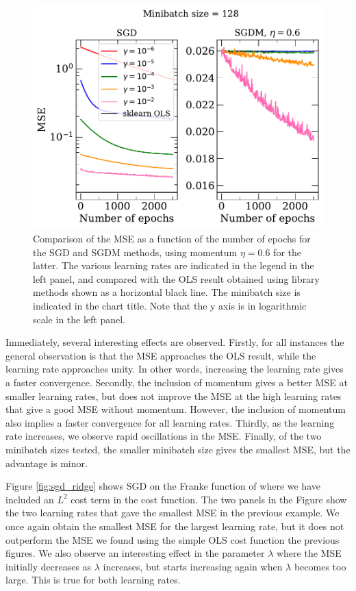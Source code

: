 \documentclass[a4paper, 
amsfonts, 
amssymb, 
amsmath, 
reprint, 
showkeys, 
nofootinbib, 
twoside]{revtex4-2}
\begin{document}
\begin{figure} [h]
    \centering
    \includegraphics[width = \columnwidth]{Figures/sgd_2.pdf}
    \caption{Comparison of the MSE as a function of the number of epochs for the SGD and SGDM methods, using momentum $\eta = 0.6$ for the latter. The various learning rates are indicated in the legend in the left panel, and compared with the OLS result obtained using library methods shown as a horizontal black line. The minibatch size is indicated in the chart title. Note that the y axis is in logarithmic scale in the left panel.}
    \label{fig:sgd_2}
\end{figure}

Immediately, several interesting effects are observed. Firstly, for all instances the general observation is that the MSE approaches the OLS result, while the learning rate approaches unity. In other words, increasing the learning rate gives a faster convergence. Secondly, the inclusion of momentum gives a better MSE at smaller learning rates, but does not improve the MSE at the high learning rates that give a good MSE without momentum. However, the inclusion of momentum also implies a faster convergence for all learning rates. Thirdly, as the learning rate increases, we observe rapid oscillations in the MSE. Finally, of the two minibatch sizes tested, the smaller minibatch size gives the smallest MSE, but the advantage is minor. 

Figure \ref{fig:sgd_ridge} shows SGD on the Franke function of where we have included an $L^2$ cost term in the cost function. The two panels in the Figure show the two learning rates that gave the smallest MSE in the previous example. We once again obtain the smallest MSE for the largest learning rate, but it does not outperform the MSE we found using the simple OLS cost function the previous figures. We also observe an interesting effect in the parameter $\lambda$ where the MSE initially decreases as $\lambda$ increases, but starts increasing again when $\lambda$ becomes too large. This is true for both learning rates. 
\end{document}
